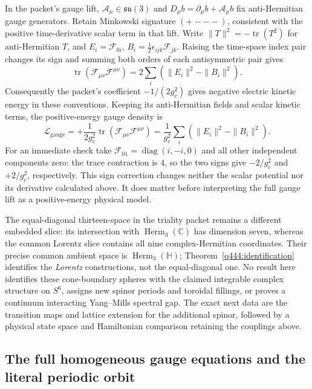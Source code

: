In the packet's gauge lift, $\mathcal A_\mu\in\mathfrak{su}(3)$ and
$D_\mu b=\partial_\mu b+\mathcal A_\mu b$ fix anti-Hermitian gauge
generators. Retain Minkowski signature $(+---)$, consistent with the
positive time-derivative scalar term in that lift. Write
$\|T\|^2=-\operatorname{tr}(T^2)$ for anti-Hermitian $T$, and
$E_i=\mathcal F_{0i}$, $B_i=\tfrac12\epsilon_{ijk}\mathcal F_{jk}$.
Raising the time-space index pair changes its sign and summing both
orders of each antisymmetric pair gives
\[
 \operatorname{tr}(\mathcal F_{\mu\nu}\mathcal F^{\mu\nu})
 =2\sum_i(\|E_i\|^2-\|B_i\|^2).
\]
Consequently the packet's coefficient $-1/(2g_c^2)$ gives negative electric
kinetic energy in these conventions. Keeping its anti-Hermitian fields
and scalar kinetic terms, the positive-energy gauge density is
\[
 \mathcal L_{\mathrm{gauge}}
 =+\frac1{2g_c^2}\operatorname{tr}
       (\mathcal F_{\mu\nu}\mathcal F^{\mu\nu})
 =\frac1{g_c^2}\sum_i(\|E_i\|^2-\|B_i\|^2).
\]
For an immediate check take $\mathcal F_{01}=\operatorname{diag}(i,-i,0)$
and all other independent components zero: the trace contraction is $4$,
so the two signs give $-2/g_c^2$ and $+2/g_c^2$, respectively. This sign
correction changes neither the scalar potential nor its derivative
calculated above. It does matter before interpreting the full gauge lift
as a positive-energy physical model.

The equal-diagonal thirteen-space in the triality packet remains a
different embedded slice: its intersection with
$\operatorname{Herm}_3(\mathbb C)$ has dimension seven, whereas the
common Lorentz slice contains all nine complex-Hermitian coordinates.
Their precise common ambient space is $\operatorname{Herm}_3(\mathbb H)$;
Theorem~\ref{q444:identification} identifies the \emph{Lorentz} constructions,
not the equal-diagonal one. No result here identifies these cone-boundary
spheres with the claimed integrable complex structure on $S^6$, assigns
new spinor periods and toroidal fillings, or proves a continuum interacting
Yang--Mills spectral gap. The exact next data are the transition maps and
lattice extension for the additional spinor, followed by a physical state
space and Hamiltonian comparison retaining the couplings above.

\subsection{The full homogeneous gauge equations and the literal periodic orbit}

